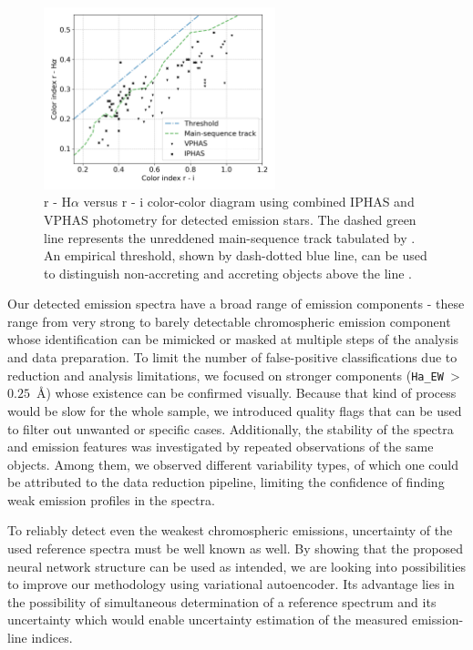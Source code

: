 \begin{figure}
	\centering
	\includegraphics[width=0.6\textwidth]{mag_iphas_vphas_sep.png}
	\caption{r - H$\alpha$ versus r - i color-color diagram using combined IPHAS and VPHAS photometry for detected emission stars. The dashed green line represents the unreddened main-sequence track tabulated by \citet{2014MNRAS.440.2036D}. An empirical threshold, shown by dash-dotted blue line, can be used to distinguish non-accreting and accreting objects above the line \cite{2018A&A...609A..10V}.}
	\label{fig:iphas_vphas}
\end{figure}

Our detected emission spectra have a broad range of emission components - these range from very strong to barely detectable chromospheric emission component whose identification can be mimicked or masked at multiple steps of the analysis and data preparation. To limit the number of false-positive classifications due to reduction and analysis limitations, we focused on stronger components (\texttt{Ha\_EW}~>~$0.25$~\AA) whose existence can be confirmed visually. Because that kind of process would be slow for the whole sample, we introduced quality flags that can be used to filter out unwanted or specific cases. Additionally, the stability of the spectra and emission features was investigated by repeated observations of the same objects. Among them, we observed different variability types, of which one could be attributed to the data reduction pipeline, limiting the confidence of finding weak emission profiles in the spectra.

To reliably detect even the weakest chromospheric emissions, uncertainty of the used reference spectra must be well known as well. By showing that the proposed neural network structure can be used as intended, we are looking into possibilities to improve our methodology using variational autoencoder. Its advantage lies in the possibility of simultaneous determination of a reference spectrum and its uncertainty which would enable uncertainty estimation of the measured emission-line indices.
